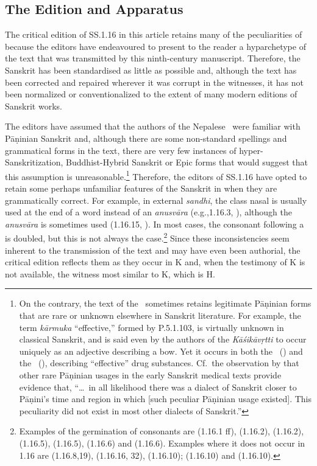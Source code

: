 \subsection{The Edition and Apparatus}

The critical edition of SS.1.16 in this article retains many of the
peculiarities of  because the editors have
endeavoured to present to the reader a hyparchetype of the text that was
transmitted by this ninth-century manuscript. Therefore, the Sanskrit has been
standardised as little as possible and, although the text has been corrected
and repaired wherever it was corrupt in the witnesses, it has not been
normalized or conventionalized to the extent of many modern editions of
Sanskrit works.

The editors have assumed that the authors of the Nepalese \SS\ were familiar
with Pāṇinian Sanskrit and, although there are some non-standard spellings and
grammatical forms in the text, there are very few instances of
hyper-Sanskritization, Buddhist-Hybrid Sanskrit or Epic forms that would
suggest that this assumption is unreasonable.\footnote{On the contrary, the
    text of the \SS\ sometimes retains legitimate Pāṇinian forms that are rare or
    unknown elsewhere in Sanskrit literature.  For example, the term
    \emph{kārmuka} “effective,” formed by P.5.1.103, is virtually unknown in
    classical Sanskrit, and is said even by the authors of the \emph{Kāśikāvṛtti}
    to occur uniquely as an adjective describing a bow.  Yet it occurs in both the
    \SS\ () and the \CS\ (), describing
    “effective” drug substances.   Cf.\ the observation by \citet[118]{desh-1988}
    that other rare Pāṇinian usages in the early Sanskrit medical texts provide
    evidence that, “\ldots\ in all likelihood there was a dialect of Sanskrit
    closer to Pāṇini's time and region in which [such peculiar Pāṇinian usage
    existed]. This peculiarity did not exist in most other dialects of Sanskrit.”}
    Therefore, the editors of SS.1.16 have opted to retain some perhaps unfamiliar
    features of the Sanskrit in  when they are
    grammatically correct. For example, in external \emph{sandhi}, the class nasal
    is usually used at the end of a word instead of an \emph{anusvāra}
    (e.g.,1.16.3, ), although the \emph{anusvāra} is
    sometimes used (1.16.15, ). In most cases, the
    consonant following a  is doubled, but this is not always the
    case.\footnote{Examples of the germination of consonants are 
        (1.16.1 ff),  (1.16.2),  (1.16.2), 
        (1.16.5),  (1.16.5),  (1.16.6) and
         (1.16.6). Examples where it does not occur in 1.16 are
         (1.16.8,19),  (1.16.16, 32), 
        (1.16.10);  (1.16.10) and  (1.16.10).}
        Since these inconsistencies seem inherent to the transmission of the text and
        may have even been authorial, the critical edition reflects them as they occur
        in K and, when the testimony of K is not available, the witness most similar
        to K, which is H.


